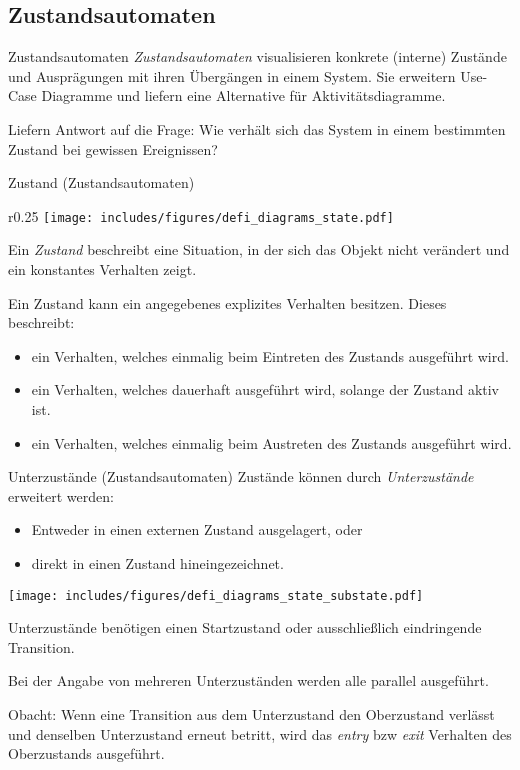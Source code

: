 \subsection{Zustandsautomaten}

\begin{defi}{Zustandsautomaten}
    \emph{Zustandsautomaten} visualisieren konkrete (interne) Zustände und Ausprägungen mit ihren Übergängen in einem System.
    Sie erweitern Use-Case Diagramme und liefern eine Alternative für Aktivitätsdiagramme.

    Liefern Antwort auf die Frage:
    Wie verhält sich das System in einem bestimmten Zustand bei gewissen Ereignissen?
\end{defi}

\begin{diag}{Zustand (Zustandsautomaten)}
    \begin{wrapfigure}{r}{0.25\textwidth}
        \centering
        \texttt{[image: includes/figures/defi\_diagrams\_state.pdf]}
    \end{wrapfigure}
    Ein \emph{Zustand} beschreibt eine Situation, in der sich das Objekt nicht verändert und ein konstantes Verhalten zeigt.

    Ein Zustand kann ein angegebenes explizites Verhalten besitzen.
    Dieses beschreibt:
    \begin{itemize}
        \item ein Verhalten, welches einmalig beim Eintreten des Zustands ausgeführt wird.
        \item ein Verhalten, welches dauerhaft ausgeführt wird, solange der Zustand aktiv ist.
        \item ein Verhalten, welches einmalig beim Austreten des Zustands ausgeführt wird.
    \end{itemize}
\end{diag}

\begin{diag}{Unterzustände (Zustandsautomaten)}
    Zustände können durch \emph{Unterzustände} erweitert werden:
    \begin{itemize}
        \item Entweder in einen externen Zustand ausgelagert, oder
        \item direkt in einen Zustand hineingezeichnet.
    \end{itemize}

    \begin{center}
        \texttt{[image: includes/figures/defi\_diagrams\_state\_substate.pdf]}
    \end{center}

    Unterzustände benötigen einen Startzustand oder ausschließlich eindringende Transition.

    Bei der Angabe von mehreren Unterzuständen werden alle parallel ausgeführt.

    Obacht: Wenn eine Transition aus dem Unterzustand den Oberzustand verlässt und denselben Unterzustand erneut betritt, wird das \emph{entry} bzw \emph{exit} Verhalten des Oberzustands ausgeführt.
\end{diag}

